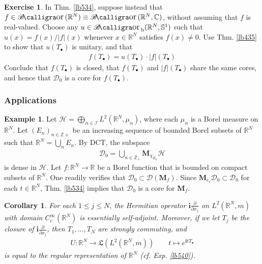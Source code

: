 \documentclass[12pt,b5paper,notitlepage]{article}
\theoremstyle{definition}
\newtheorem{eg}[df]{Example}
\newtheorem{exe}[df]{Exercise}
\theoremstyle{plain}
\newtheorem{co}[df]{Corollary}
\DeclareMathOperator{\Bor}{\mathscr{B}\text{\kern -2pt {\calligra\large or}}\,}
\DeclareMathOperator{\Borb}{{\mathscr{B}\text{\kern -2pt {\calligra\large or}}\,}_{\mathrm b}}
\newcommand{\fk}{\mathfrak}
\newcommand{\Dom}{\mathscr{D}}
\newcommand{\im}{\mathbf{i}}
\newcommand{\blt}{\bullet}
\newcommand{\Cbb}{\mathbb C}
\newcommand{\Zbb}{\mathbb Z}
\newcommand{\Rbb}{\mathbb R}
\newcommand{\Sbb}{{\mathbb S}}
\newcommand{\MH}{\mathcal H}
\newcommand{\SI}{\mathscr I}
\newcommand{\Mbf}{\mathbf M}
\numberwithin{equation}{section}
\begin{document}
\begin{exe}
In Thm. \ref{lb534}, suppose instead that $f\in\Bor(\Rbb^N)\equiv\Bor(\Rbb^N,\Cbb)$, without assuming that $f$ is real-valued. Choose any $u\in\Borb(\Rbb^N,\Sbb^1)$ such that $u(x)=f(x)/|f|(x)$ whenever $x\in\Rbb^N$ satisfies $f(x)\neq0$. Use Thm. \ref{lb435} to show that $u(T_\blt)$ is unitary, and that
\begin{align}
f(T_\blt)=u(T_\blt)\cdot|f|(T_\blt)
\end{align}
Conclude that $f(T_\blt)$ is closed, that $f(T_\blt)$ and $|f|(T_\blt)$ share the same cores, and hence that $\Dom_0$ is a core for $f(T_\blt)$.
\end{exe}



\subsubsection{Applications}

\begin{eg}\label{lb564}
Let $\MH=\bigoplus_{\alpha\in\SI}L^2(\Rbb^N,\mu_\alpha)$, where each $\mu_\alpha$ is a Borel measure on $\Rbb^N$. Let $(E_n)_{n\in\Zbb+}$ be an increasing sequence of bounded Borel subsets of $\Rbb^N$ such that $\Rbb^N = \bigcup_n E_n$. By DCT, the subspace
\begin{align*}
\Dom_0=\bigcup_{n\in\Zbb_+}\Mbf_{\chi_{E_n}}\MH
\end{align*}
is dense in $\MH$. Let $f:\Rbb^N\rightarrow\Rbb$ be a Borel function that is bounded on compact subsets of $\Rbb^N$. One readily verifies that $\Dom_0\subset\Dom(\Mbf_f)$. Since $\Mbf_{e_t}\Dom_0\subset\Dom_0$ for each $t\in\Rbb^N$, Thm. \ref{lb534} implies that $\Dom_0$ is a core for $\Mbf_f$.
\end{eg}



\begin{co}\label{lb541}
For each $1\leq j\leq N$, the Hermitian operator $\im\frac \partial{\partial x_j}$ on $L^2(\Rbb^N,m)$ with domain $C_c^\infty(\Rbb^N)$ is essentially self-adjoint. Moreover, if we let $T_j$ be the closure of $\im\frac\partial{\partial x_j}$, then $T_1,\dots,T_N$ are strongly commuting, and
\begin{align*}
U:\Rbb^N\rightarrow\fk L(L^2(\Rbb^N,m))\qquad t\mapsto e^{\im tT_\blt}
\end{align*} 
is equal to the regular representation of $\Rbb^N$ (cf. Exp. \ref{lb540}).
\end{co}
\end{document}
